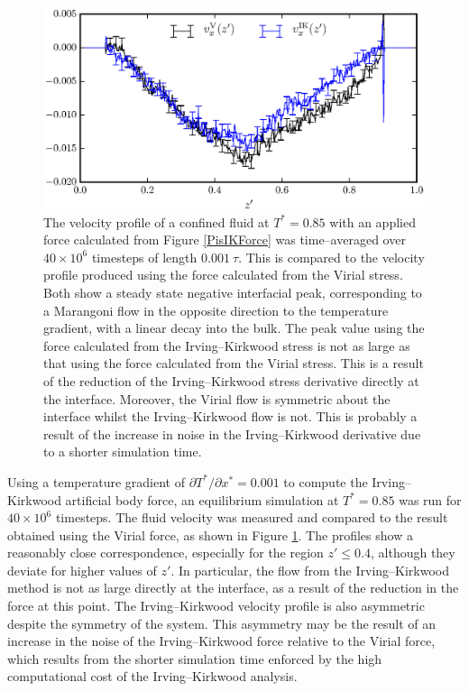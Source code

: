 \begin{figure}[h]
\centering
\includegraphics[scale=1.0]{PisIKFlow}
\caption{The velocity profile of a confined fluid at $T^{*}=0.85$ with an applied force calculated from Figure \ref{PisIKForce} was time--averaged over $40 \times 10^{6}$ timesteps of length $0.001\ \tau$.
This is compared to the velocity profile produced using the force calculated from the Virial stress.
Both show a steady state negative interfacial peak, corresponding to a Marangoni flow in the opposite direction to the temperature gradient, with a linear decay into the bulk.
The peak value using the force calculated from the Irving--Kirkwood stress is not as large as that using the force calculated from the Virial stress.
This is a result of the reduction of the Irving--Kirkwood stress derivative directly at the interface.
Moreover, the Virial flow is symmetric about the interface whilst the Irving--Kirkwood flow is not. 
This is probably a result of the increase in noise in the Irving--Kirkwood derivative due to a shorter simulation time.}
\label{PisIKFlow}
\end{figure}
Using a temperature gradient of $\partial T^{*} / \partial x^{*} = 0.001$ to compute the Irving--Kirkwood artificial body force, an equilibrium simulation at $T^{*} = 0.85$ was run for $40 \times 10^{6}$ timesteps.
The fluid velocity was measured and compared to the result obtained using the Virial force, as shown in Figure \ref{PisIKFlow}.
The profiles show a reasonably close correspondence, especially for the region $z' \leq 0.4$, although they deviate for higher values of $z'$.
In particular, the flow from the Irving--Kirkwood method is not as large directly at the interface, as a result of the reduction in the force at this point.
The Irving--Kirkwood velocity profile is also asymmetric despite the symmetry of the system.
This asymmetry may be the result of an increase in the noise of the Irving--Kirkwood force relative to the Virial force, which results from the shorter simulation time enforced by the high computational cost of the Irving--Kirkwood analysis.

